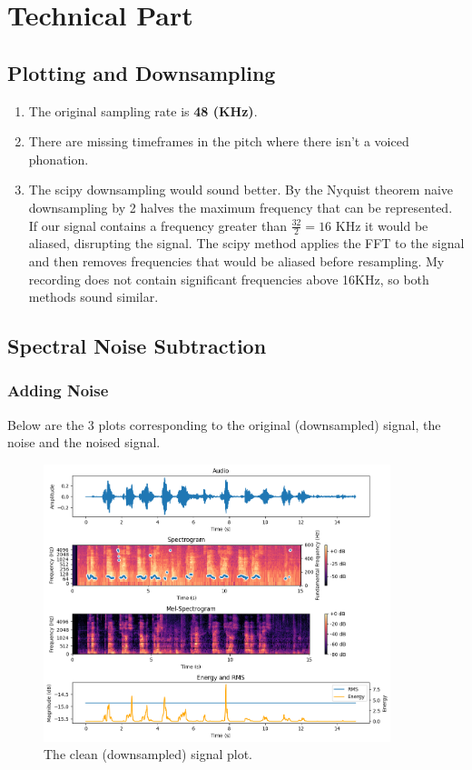 \section{Technical Part}

\renewcommand{\labelenumi}{\alph{enumi}.}

\subsection{Plotting and Downsampling}
\begin{enumerate}
  \item The original sampling rate is \textbf{48 (KHz)}.
  \item There are missing timeframes in the pitch where there isn't a voiced phonation.
  \item The scipy downsampling would sound better. 
  By the Nyquist theorem naive downsampling by 2 halves the maximum frequency that can be represented.
  If our signal contains a frequency greater than $\frac{32}{2}=16$ KHz it would be aliased, disrupting the signal.
  The scipy method applies the FFT to the signal and then removes frequencies that would be aliased before resampling.
  My recording does not contain significant frequencies above 16KHz, so both methods sound similar. 
\end{enumerate}


\subsection{Spectral Noise Subtraction}

\subsubsection{Adding Noise}
Below are the 3 plots corresponding to the original (downsampled) signal, the noise and the noised signal.
\begin{figure}[h]
  \centering
  \includegraphics[width=0.9\textwidth]{downsampled_clean_plot.png}
  \caption{The clean (downsampled) signal plot.}
\end{figure}

